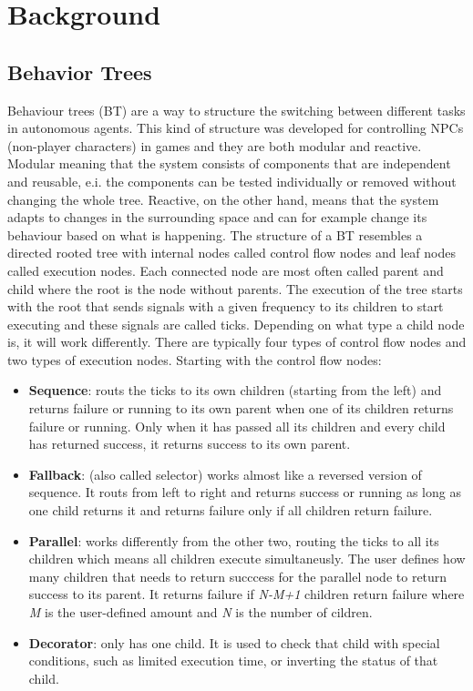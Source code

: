 \section{Background}

\subsection{Behavior Trees}
Behaviour trees (BT) are a way to structure the switching between different tasks in autonomous agents. This kind 
of structure was developed for controlling NPCs (non-player characters) in games and they are both modular and reactive. 
Modular meaning that the system consists of components that are independent and reusable, e.i. the components can be 
tested individually or removed without changing the whole tree. Reactive, on the other hand, means that the system 
adapts to changes in the surrounding space and can for example change its behaviour based on what is happening. The 
structure of a BT resembles a directed rooted tree with internal nodes called control flow nodes and leaf nodes called 
execution nodes. Each connected node are most often called parent and child where the root is the node without parents. 
The execution of the tree starts with the root that sends signals with a given frequency to its children to start executing 
and these signals are called ticks. Depending on what type a child node is, it will work differently. There are typically 
four types of control flow nodes and two types of execution nodes. Starting with the control flow nodes:
\begin{itemize}
    \item \textbf{Sequence}: routs the ticks to its own children (starting from the left) and returns failure or running to its own parent when one of its children returns failure or running. Only when it has passed all its children and every child has returned success, it returns success to its own parent.
    \item \textbf{Fallback}: (also called selector) works almost like a reversed version of sequence. It routs from left to right and returns success or running as long as one child returns it and returns failure only if all children return failure. 
    \item \textbf{Parallel}: works differently from the other two, routing the ticks to all its children which means all children execute simultaneusly. The user defines how many children that needs to return succcess for the parallel node to return success to its parent. It returns failure if \textit{N-M+1} children return failure where \textit{M} is the user-defined amount and \textit{N} is the number of cildren.
    \item \textbf{Decorator}: only has one child. It is used to check that child with special conditions, such as limited execution time, or inverting the status of that child. 
\end{itemize}
